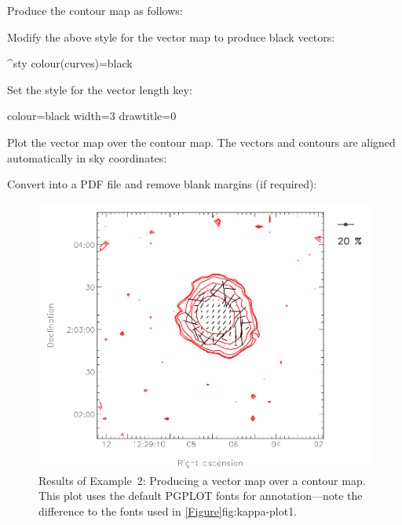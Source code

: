Produce the contour map as follows:

\begin{terminalv}
\end{terminalv}


Modify the above style for the vector map to produce black vectors:

\begin{terminalv}
^sty
colour(curves)=black
\end{terminalv}


Set the style for the vector length key:


\begin{terminalv}
colour=black
width=3
drawtitle=0
\end{terminalv}

Plot the vector map over the contour map. The vectors and contours are
aligned automatically in sky coordinates:

\begin{terminalv}
\end{terminalv}


Convert into a PDF file and remove blank margins (if required):

\begin{terminalv}
\end{terminalv}

\begin{figure}[t!]
\begin{center}
\includegraphics[width=0.75\linewidth]{sc22-kappa-plots-plot2.png}

\caption [Vector map with contour map in polplot]{Results of Example~2:
  Producing a vector map over a contour map. This plot uses the default
PGPLOT fonts for annotation---note the difference to the fonts used in
\cref{Figure}{fig:kappa-plot1}{}. \label{fig:kappa-plot2}}
\end{center}
\end{figure}

